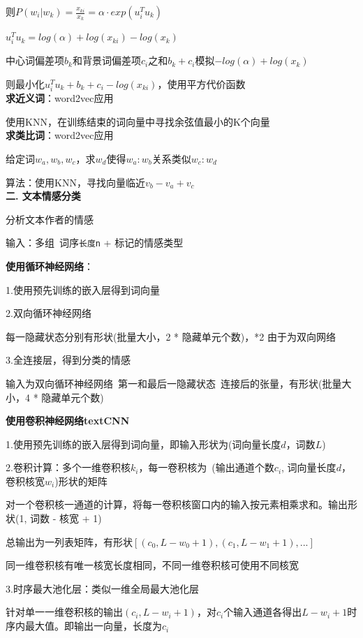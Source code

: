 \documentclass[UTF8]{ctexart}
\begin{document}
  \quad 则$P(w_i | w_k) = \frac{x_{ki}}{x_k} = \alpha \cdot exp(u_i^Tu_k)$

  \quad \quad $u_i^Tu_k = log(\alpha) + log(x_{ki}) - log(x_k)$

  \quad 中心词偏差项$b_k$和背景词偏差项$c_i$之和$b_k + c_i$模拟$-log(\alpha) + log(x_k)$

  \quad 则最小化$u_i^Tu_k + b_k + c_i - log(x_{ki})$，使用平方代价函数\\
\textbf{求近义词}：word2vec应用

  使用KNN，在训练结束的词向量中寻找余弦值最小的K个向量\\
\textbf{求类比词}：word2vec应用

  给定词$w_a, w_b, w_c$，求$w_d$使得$w_a : w_b$关系类似$w_c:w_d$

  算法：使用KNN，寻找向量临近$v_b - v_a + v_c$\\
\textbf{二. 文本情感分类}

  分析文本作者的情感

  输入：多组\ 词序\texttt{长度n} + 标记的情感类型

  \textbf{使用循环神经网络}：

  \quad 1.使用预先训练的嵌入层得到词向量

  \quad 2.双向循环神经网络

  \quad \quad 每一隐藏状态分别有形状(批量大小，2 * 隐藏单元个数)，*2 由于为双向网络

  \quad 3.全连接层，得到分类的情感

  \quad \quad 输入为双向循环神经网络\ 第一和最后一隐藏状态\ 连接后的张量，有形状(批量大小，4 * 隐藏单元个数)

  \textbf{使用卷积神经网络textCNN}

  \quad 1.使用预先训练的嵌入层得到词向量，即输入形状为(词向量长度$d$，词数$L$)

  \quad 2.卷积计算：多个一维卷积核$k_i$，每一卷积核为\ (输出通道个数$c_i$, 词向量长度$d$，卷积核宽$w_i$)形状的矩阵

  \quad \quad 对一个卷积核一通道的计算，将每一卷积核窗口内的输入按元素相乘求和。输出形状(1, 词数 - 核宽 + 1)

  \quad \quad 总输出为一列表矩阵，有形状$[(c_0, L - w_0 + 1), (c_1, L - w_1 + 1), ...]$

  \quad \quad 同一维卷积核有唯一核宽长度相同，不同一维卷积核可使用不同核宽

  \quad 3.时序最大池化层：类似一维全局最大池化层
  
  \quad \quad 针对单一一维卷积核的输出$(c_i, L - w_i + 1)$，对$c_i$个输入通道各得出$L - w_i + 1$时序内最大值。即输出一向量，长度为$c_i$
  
\end{document}
